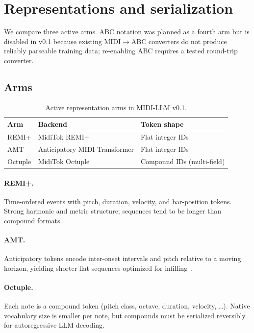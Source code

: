 \section{Representations and serialization}
\label{sec:repr}

We compare three active arms. ABC notation was planned as a fourth arm but is disabled in v0.1 because existing MIDI$\to$ABC converters do not produce reliably parseable training data; re-enabling ABC requires a tested round-trip converter.

\subsection{Arms}

\begin{table}[h]
\centering
\small
\begin{tabular}{@{}lll@{}}
\toprule
\textbf{Arm} & \textbf{Backend} & \textbf{Token shape} \\
\midrule
REMI+ & MidiTok REMI+ & Flat integer IDs \\
AMT & Anticipatory MIDI Transformer & Flat integer IDs \\
Octuple & MidiTok Octuple & Compound IDs (multi-field) \\
\bottomrule
\end{tabular}
\caption{Active representation arms in MIDI-LLM v0.1.}
\label{tab:arms}
\end{table}

\paragraph{REMI+.}
Time-ordered events with pitch, duration, velocity, and bar-position tokens. Strong harmonic and metric structure; sequences tend to be longer than compound formats.

\paragraph{AMT.}
Anticipatory tokens encode inter-onset intervals and pitch relative to a moving horizon, yielding shorter flat sequences optimized for infilling~\cite{thickstun2023anticipation}.

\paragraph{Octuple.}
Each note is a compound token (pitch class, octave, duration, velocity, \ldots). Native vocabulary size is smaller per note, but compounds must be serialized reversibly for autoregressive LLM decoding.

